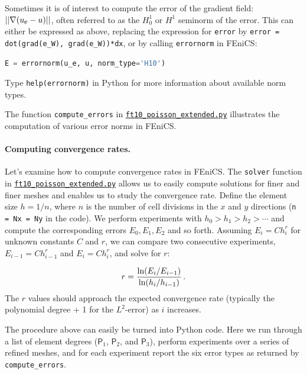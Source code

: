 \documentclass[graybox,envcountchap,sectrefs,final]{svmonodo}
\begin{document}
Sometimes it is of interest to compute the error of the
gradient field: $||\nabla (\uex-u)||$,
often referred to as the $H^1_0$ or $H^1$ seminorm of the error.
This can either be expressed as above, replacing the expression for
\texttt{error} by \Verb!error = dot(grad(e_W), grad(e_W))*dx!, or by calling
\texttt{errornorm} in FEniCS:

\begin{lstlisting}[language=Python,style=graycolor]
E = errornorm(u_e, u, norm_type='H10')
\end{lstlisting}
Type \texttt{help(errornorm)} in Python for more information about available
norm types.

The function \Verb!compute_errors! in
\href{{https://fenicsproject.org/pub/tutorial/python/vol1/ft10_poisson_extended.py}}{\nolinkurl{ft10_poisson_extended.py}}
illustrates the computation of various error norms in FEniCS.


\paragraph{Computing convergence rates.}
Let's examine how to compute convergence rates in FEniCS.
The \texttt{solver} function in
\href{{https://fenicsproject.org/pub/tutorial/python/vol1/ft10_poisson_extended.py}}{\nolinkurl{ft10_poisson_extended.py}}
allows us to easily compute solutions for finer and finer meshes and
enables us to study the convergence rate. Define the element size
$h=1/n$, where $n$ is the number of cell divisions in the $x$ and $y$
directions (\texttt{n = Nx = Ny} in the code). We perform experiments with
$h_0>h_1>h_2>\cdots$ and compute the corresponding errors $E_0, E_1,
E_2$ and so forth. Assuming $E_i=Ch_i^r$ for unknown constants $C$ and
$r$, we can compare two consecutive experiments, $E_{i-1}=Ch_{i-1}^r$
and $E_i=Ch_i^r$, and solve for $r$:

\begin{equation*}
r = {\ln(E_i/E_{i-1})\over\ln (h_i/h_{i-1})}\tp
\end{equation*}
The $r$ values should approach the expected convergence rate
(typically the polynomial degree + 1 for the $L^2$-error) as $i$
increases.

The procedure above can easily be turned into Python code. Here
we run through a list of element degrees ($\mathsf{P}_1$,
$\mathsf{P}_2$, and $\mathsf{P}_3$),
perform experiments over a series of refined meshes, and for
each experiment report the six error types as returned by \Verb!compute_errors!.
\end{document}
